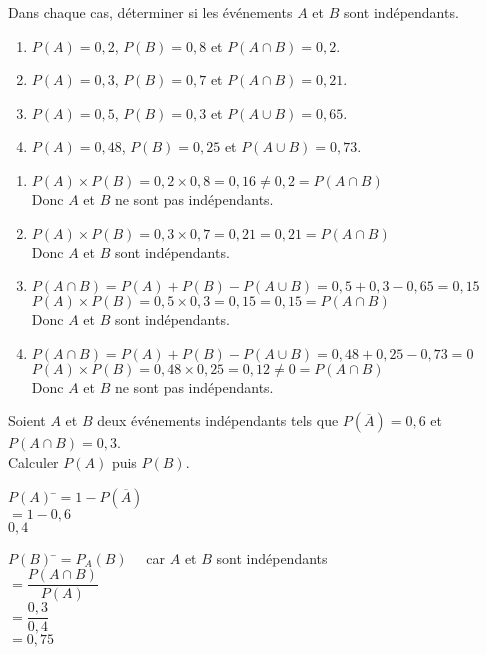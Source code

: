 \documentclass[a4paper,11pt,exos]{nsi} %
\begin{document}
\maketitle

\exo{}
\textcolor{UGLiBlue}{Dans chaque cas, déterminer si les événements $A$ et $B$ sont indépendants.
\begin{enumerate}
    \item $P(A)=0,2$, $P(B)=0,8$ et $P(A\cap B)=0,2$.
    \item $P(A)=0,3$, $P(B)=0,7$ et $P(A\cap B)=0,21$.
    \item $P(A)=0,5$, $P(B)=0,3$ et $P(A\cup B)=0,65$.
    \item $P(A)=0,48$, $P(B)=0,25$ et $P(A\cup B)=0,73$.
\end{enumerate}}

\begin{enumerate}
    \item $P(A)\times P(B)=0,2\times 0,8=0,16\neq 0,2=P(A\cap B)$\\
    Donc $A$ et $B$ ne sont pas indépendants.
    \item $P(A)\times P(B)=0,3\times 0,7=0,21=0,21=P(A\cap B)$\\
    Donc $A$ et $B$ sont indépendants.	
    \item $P(A\cap B)=P(A)+P(B)-P(A\cup B)=0,5+0,3-0,65=0,15$\\
    $P(A)\times P(B)=0,5\times 0,3=0,15=0,15=P(A\cap B)$\\
    Donc $A$ et $B$ sont indépendants.
    \item $P(A\cap B)=P(A)+P(B)-P(A\cup B)=0,48+0,25-0,73=0$\\
    $P(A)\times P(B)=0,48\times 0,25=0,12\neq 0=P(A\cap B)$\\
    Donc $A$ et $B$ ne sont pas indépendants.
\end{enumerate}

\exo{}
\textcolor{UGLiBlue}{Soient $A$ et $B$ deux événements indépendants tels que $P(\overline{A})=0,6$ et $P(A\cap B)=0,3$.\\
Calculer $P(A)$ puis $P(B)$.}

\begin{multicols}{2}
    \begin{tabbing}
        $P(A)$  \=$=1-P(\overline{A})$\\
                \>$=1-0,6$\\
                \>$0,4$
    \end{tabbing}
    \vfill\null
    \columnbreak
    \begin{tabbing}
        $P(B)$  \=$=P_A(B)\quad$ car $A$ et $B$ sont indépendants\\
                \>$=\dfrac{P(A\cap B)}{P(A)}$\\
                \>$=\dfrac{0,3}{0,4}$\\
                \>$=0,75$
    \end{tabbing}
\end{multicols}
\end{document}
